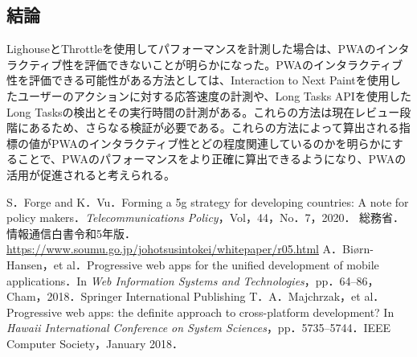 \begin{multicols*}{2}
\subsection{結論}
LighouseとThrottleを使用してパフォーマンスを計測した場合は、PWAのインタラクティブ性を評価できないことが明らかになった。PWAのインタラクティブ性を評価できる可能性がある方法としては、Interaction to Next Paintを使用したユーザーのアクションに対する応答速度の計測や、Long Tasks APIを使用したLong Tasksの検出とその実行時間の計測がある。これらの方法は現在レビュー段階にあるため、さらなる検証が必要である。これらの方法によって算出される指標の値がPWAのインタラクティブ性とどの程度関連しているのかを明らかにすることで、PWAのパフォーマンスをより正確に算出できるようになり、PWAの活用が促進されると考えられる。

\begin{thebibliography}{9}
 S．Forge and K．Vu．Forming a 5g strategy for developing countries: A note for policy makers．\textit{Telecommunications Policy}，Vol，44，No．7，2020．
 総務省．情報通信白書令和5年版．\url{https://www.soumu.go.jp/johotsusintokei/whitepaper/r05.html}
 A．Biørn-Hansen，et al．Progressive web apps for the unified development of mobile applications．In \textit{Web Information Systems and Technologies}，pp．64–86，Cham，2018．Springer International Publishing
 T．A．Majchrzak，et al．Progressive web apps: the definite approach to cross-platform development? In \textit{Hawaii International Conference on System Sciences}，pp．5735–5744．IEEE Computer Society，January 2018．
\end{thebibliography}
\end{multicols*} 


